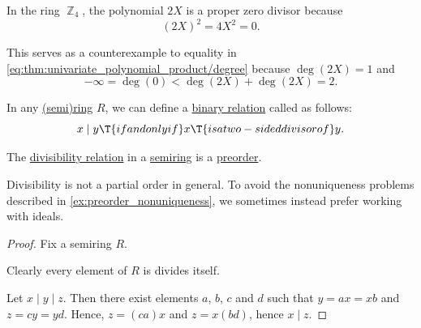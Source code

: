 \begin{example}
\begin{thmenum}
     In the ring \hyperref[def:ring_of_integers_modulo]{\( \BbbZ_4 \)}, the polynomial \( 2X \) is a proper zero divisor because
    \begin{equation*}
      (2X)^2 = 4X^2 = 0.
    \end{equation*}

    This serves as a counterexample to equality in \eqref{eq:thm:univariate_polynomial_product/degree} because \( \deg(2X) = 1 \) and
    \begin{equation*}
      -\infty = \deg(0) < \deg(2X) + \deg(2X) = 2.
    \end{equation*}
  \end{thmenum}
\end{example}

\begin{definition}\label{def:divisibility_relation}
  In any \hyperref[def:semiring]{(semi)ring} \( R \), we can define a \hyperref[def:binary_relation]{binary relation} called  as follows:
  \begin{equation*}
    x \mid y \T{if and only if} x \T{is a two-sided divisor of} y.
  \end{equation*}
\end{definition}

\begin{proposition}\label{thm:semiring_divisibility_order}
  The \hyperref[def:semiring_divisibility]{divisibility relation} in a \hyperref[def:semiring]{semiring} is a \hyperref[def:preordered_set]{preorder}.
\end{proposition}
\begin{comments}
  \item Divisibility is not a partial order in general. To avoid the nonuniqueness problems described in \cref{ex:preorder_nonuniqueness}, we sometimes instead prefer working with ideals.
\end{comments}
\begin{proof}
  Fix a semiring \( R \).

   Clearly every element of \( R \) is divides itself.

   Let \( x \mid y \mid z \). Then there exist elements \( a \), \( b \), \( c \) and \( d \) such that \( y = a x = x b \) and \( z = c y = y d \). Hence, \( z = (ca) x \) and \( z = x (bd) \), hence \( x \mid z \).
\end{proof}

